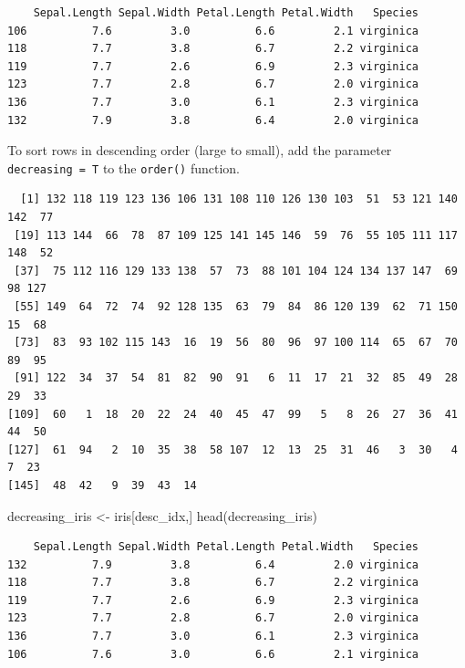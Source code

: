 \documentclass[
  letterpaper,
]{book}
\newenvironment{Shaded}{\begin{snugshade}}{\end{snugshade}}
\newcommand{\AttributeTok}[1]{\textcolor[rgb]{0.40,0.45,0.13}{#1}}
\newcommand{\FunctionTok}[1]{\textcolor[rgb]{0.28,0.35,0.67}{#1}}
\newcommand{\NormalTok}[1]{\textcolor[rgb]{0.00,0.23,0.31}{#1}}
\newcommand{\OtherTok}[1]{\textcolor[rgb]{0.00,0.23,0.31}{#1}}
\newcommand{\SpecialCharTok}[1]{\textcolor[rgb]{0.37,0.37,0.37}{#1}}
\begin{document}
\begin{verbatim}
    Sepal.Length Sepal.Width Petal.Length Petal.Width   Species
106          7.6         3.0          6.6         2.1 virginica
118          7.7         3.8          6.7         2.2 virginica
119          7.7         2.6          6.9         2.3 virginica
123          7.7         2.8          6.7         2.0 virginica
136          7.7         3.0          6.1         2.3 virginica
132          7.9         3.8          6.4         2.0 virginica
\end{verbatim}

To sort rows in descending order (large to small), add the parameter
\texttt{decreasing\ =\ T} to the \texttt{order()} function.

\begin{Shaded}
\end{Shaded}

\begin{verbatim}
  [1] 132 118 119 123 136 106 131 108 110 126 130 103  51  53 121 140 142  77
 [19] 113 144  66  78  87 109 125 141 145 146  59  76  55 105 111 117 148  52
 [37]  75 112 116 129 133 138  57  73  88 101 104 124 134 137 147  69  98 127
 [55] 149  64  72  74  92 128 135  63  79  84  86 120 139  62  71 150  15  68
 [73]  83  93 102 115 143  16  19  56  80  96  97 100 114  65  67  70  89  95
 [91] 122  34  37  54  81  82  90  91   6  11  17  21  32  85  49  28  29  33
[109]  60   1  18  20  22  24  40  45  47  99   5   8  26  27  36  41  44  50
[127]  61  94   2  10  35  38  58 107  12  13  25  31  46   3  30   4   7  23
[145]  48  42   9  39  43  14
\end{verbatim}

\begin{Shaded}
\begin{Highlighting}[]
\NormalTok{decreasing\_iris }\OtherTok{\textless{}{-}}\NormalTok{ iris[desc\_idx,]}
\FunctionTok{head}\NormalTok{(decreasing\_iris)}
\end{Highlighting}
\end{Shaded}

\begin{verbatim}
    Sepal.Length Sepal.Width Petal.Length Petal.Width   Species
132          7.9         3.8          6.4         2.0 virginica
118          7.7         3.8          6.7         2.2 virginica
119          7.7         2.6          6.9         2.3 virginica
123          7.7         2.8          6.7         2.0 virginica
136          7.7         3.0          6.1         2.3 virginica
106          7.6         3.0          6.6         2.1 virginica
\end{verbatim}
\end{document}
